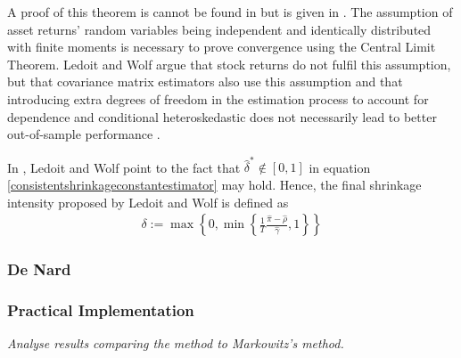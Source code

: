     	A proof of this theorem is cannot be found in \cite{ledoit} but is given in \cite{ledoit2003}. The assumption of asset returns' random variables being independent and identically distributed with finite moments is necessary to prove convergence using the Central Limit Theorem. Ledoit and Wolf argue that stock returns do not fulfil this assumption, but that covariance matrix estimators also use this assumption and that introducing extra degrees of freedom in the estimation process to account for dependence and conditional heteroskedastic does not necessarily lead to better out-of-sample performance \cite{ledoit2003}.
    	
    	In \cite{ledoit}, Ledoit and Wolf point to the fact that $\hat{\delta}^* \notin [0,1]$ in equation \ref{consistentshrinkageconstantestimator} may hold. Hence, the final shrinkage intensity proposed by Ledoit and Wolf is defined as
    	\begin{align*}
    	    \delta := \max \left\{ 0, \min \left\{ \frac{1}{T} \frac{\hat{\pi} - \hat{\rho}}{\hat{\gamma}}, 1 \right\} \right\}
    	\end{align*}
    
    \subsubsection{De Nard}
        \cite{denard}
    
    \subsubsection{Practical Implementation}
        \textit{Analyse results comparing the method to Markowitz's method.}
    
%    
%    
    
